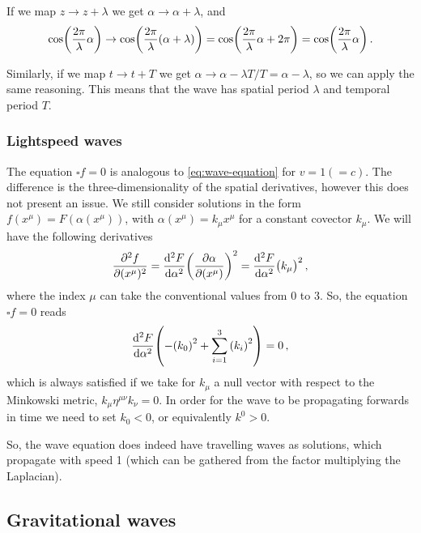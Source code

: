 \documentclass[main.tex]{subfiles}
\begin{document}
If we map \(z \rightarrow z  + \lambda \) we get \(\alpha \rightarrow \alpha +\lambda \), and 
%
\begin{align}
\cos(\frac{2 \pi }{\lambda } \alpha ) \rightarrow \cos(\frac{2 \pi }{\lambda }\qty(\alpha + \lambda )) = \cos(\frac{2 \pi }{\lambda } \alpha  + 2 \pi ) = \cos(\frac{2 \pi }{\lambda } \alpha )
\,.
\end{align}

Similarly, if we map \(t \rightarrow t + T\) we get \(\alpha \rightarrow \alpha - \lambda T/T = \alpha - \lambda  \), so we can apply the same reasoning. This means that the wave has spatial period \(\lambda \) and temporal period \(T\). 

\subsubsection{Lightspeed waves}

The equation \(\square f = 0\) is analogous to \eqref{eq:wave-equation} for \(v = 1 (= c)\). The difference is the three-dimensionality of the spatial derivatives, however this does not present an issue. 
We still consider solutions in the form \(f (x^{\mu }) = F(\alpha (x^{\mu }) )\), with \(\alpha (x^{\mu }) = k_{\mu } x^{ \mu }\) for a constant covector \(k_{\mu }\). We will have the following derivatives 
%
\begin{align}
\pdv[2]{f}{(x^{\mu })} 
= \dv[2]{F}{\alpha }
\qty( \pdv{\alpha }{(x^{\mu})} )^2
= \dv[2]{F}{\alpha }
\qty(k_{\mu })^2
\,,
\end{align}
%
where the index \(\mu \) can take the conventional values from \(0\) to \(3\). 
So, the equation \(\square f = 0\) reads 
%
\begin{align}
\dv[2]{F}{\alpha } \qty(-\qty(k_{0})^2 + \sum_{i=1 }^{3} \qty(k_{i })^2) = 0
\,,
\end{align}
%
which is always satisfied if we take for  \(k_{\mu }\) a null vector with respect to the Minkowski metric, \(k_{\mu } \eta^{\mu \nu } k_{\nu } = 0 \). 
In order for the wave to be propagating forwards in time we need to set \(k_{0} < 0\), or equivalently \(k^{0}>0\). 

So, the wave equation does indeed have travelling waves as solutions, which propagate with speed 1 (which can be gathered from the factor multiplying the Laplacian). 

\subsection{Gravitational waves}
\end{document}
